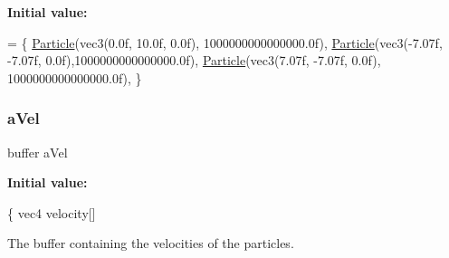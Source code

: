 {\bfseries Initial value\+:}
\begin{DoxyCode}
=
\{
    \hyperlink{struct_particle}{Particle}(vec3(0.0f, 10.0f, 0.0f),   1000000000000000.0f),
    \hyperlink{struct_particle}{Particle}(vec3(-7.07f, -7.07f, 0.0f),1000000000000000.0f),
    \hyperlink{struct_particle}{Particle}(vec3(7.07f, -7.07f, 0.0f), 1000000000000000.0f),
\}
\end{DoxyCode}
\mbox{\label{particle__attraction_8comp_a8873b6c4414371b20f8c9adb4fbb0b0e}} 
\subsubsection{\texorpdfstring{a\+Vel}{aVel}}
{\footnotesize\ttfamily buffer a\+Vel}

{\bfseries Initial value\+:}
\begin{DoxyCode}
\{
    vec4 velocity[]
\end{DoxyCode}


The buffer containing the velocities of the particles. 

